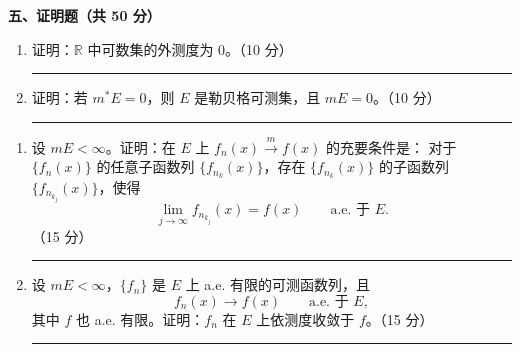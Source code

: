\documentclass[UTF8,11pt,fontset=fandol]{ctexart}
\newcommand{\examsection}[1]{%
  \par\vspace{0.35em}
  \begin{center}
    \large\bfseries #1
  \end{center}
  \vspace{0.15em}
}
\newcommand{\answerarea}[1]{%
  \par\vspace{0.25em}
  \rule{\linewidth}{0pt}\par
  \vspace{#1}
}
\newcommand{\measconv}{\xrightarrow{m}}
\begin{document}
\examsection{五、证明题（共 50 分）}

\begin{enumerate}
  \item 证明：$\mathbb{R}$ 中可数集的外测度为 $0$。（10 分）
    \answerarea{4.1cm}

  \item 证明：若 $m^{*}E=0$，则 $E$ 是勒贝格可测集，且 $mE=0$。（10 分）
    \answerarea{4.1cm}
\end{enumerate}

\newpage

\begin{enumerate}[start=3]
  \item 设 $mE<\infty$。证明：在 $E$ 上 $f_n(x)\measconv f(x)$ 的充要条件是：
    对于 $\{f_n(x)\}$ 的任意子函数列 $\{f_{n_k}(x)\}$，存在
    $\{f_{n_k}(x)\}$ 的子函数列 $\{f_{n_{k_j}}(x)\}$，使得
    \[
      \lim_{j\to\infty}f_{n_{k_j}}(x)=f(x)
      \qquad \text{a.e. 于 }E.
    \]
    （15 分）
    \answerarea{7.2cm}

  \item 设 $mE<\infty$，$\{f_n\}$ 是 $E$ 上 a.e. 有限的可测函数列，且
    \[
      f_n(x)\to f(x)\qquad \text{a.e. 于 }E,
    \]
    其中 $f$ 也 a.e. 有限。证明：$f_n$ 在 $E$ 上依测度收敛于 $f$。（15 分）
    \answerarea{7.2cm}
\end{enumerate}
\end{document}
